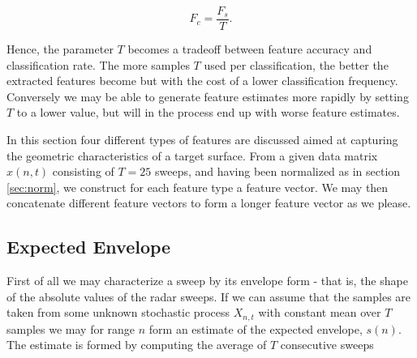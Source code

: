 \begin{equation}
	\label{eq:classification_rate}
	F_c = \frac{F_s}{T}.
\end{equation} 

Hence, the parameter $T$ becomes a tradeoff between feature accuracy and classification rate. The more samples $T$ used per classification, the better the extracted features become but with the cost of a lower classification frequency. Conversely we may be able to generate feature estimates more rapidly by setting $T$ to a lower value, but will in the process end up with worse feature estimates. 


In this section four different types of features are discussed aimed at capturing the geometric characteristics of a target surface. From a given data matrix $x(n,t)$ consisting of $T=25$ sweeps, and having been normalized as in section \ref{sec:norm}, we construct for each feature type a feature vector. We may then concatenate different feature vectors to form a longer feature vector as we please.  




\subsection{Expected Envelope}

First of all we may characterize a sweep by its envelope form - that is, the shape of the absolute values of the radar sweeps. If we can assume that the samples are taken from some unknown stochastic process $X_{n,t}$ with constant mean over $T$ samples we may for range $n$ form an estimate of the expected envelope, $s(n)$. The estimate is formed by computing the average of $T$ consecutive sweeps

